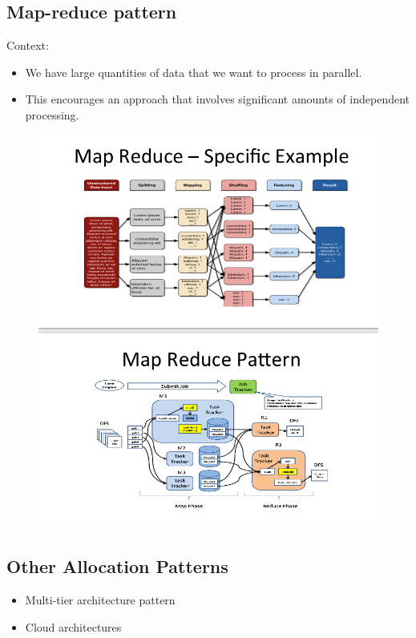 \documentclass[a4paper]{report}
\begin{document}
\subsection{Map-reduce pattern}

Context:
\begin{itemize}
\item
  We have large quantities of data that we want to process in parallel.
\item
  This encourages an approach that involves significant amounts of independent processing.
\end{itemize}

\begin{figure}[H]
\centering
  \includegraphics[width=1\linewidth]
  {images/mapreduce.png}
\end{figure}

\subsection{Other Allocation Patterns}

\begin{itemize}
\item
  Multi-tier architecture pattern
\item
  Cloud architectures
\end{itemize}
\end{document}
